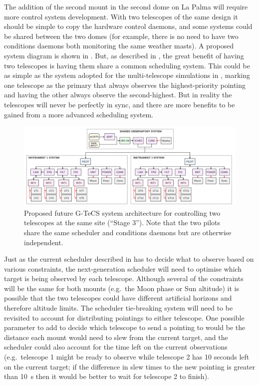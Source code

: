 \begin{colsection}
\begin{colsection}
The addition of the second mount in the second dome on La Palma will require more control system development. With two telescopes of the same design it should be simple to copy the hardware control daemons, and some systems could be shared between the two domes (for example, there is no need to have two conditions daemons both monitoring the same weather masts). A proposed system diagram is shown in . But, as described in , the great benefit of having two telescopes is having them share a common scheduling system. This could be as simple as the system adopted for the multi-telescope simulations in , marking one telescope as the primary that always observes the highest-priority pointing and having the other always observe the second-highest. But in reality the telescopes will never be perfectly in sync, and there are more benefits to be gained from a more advanced scheduling system.

\begin{figure}[t]
    \begin{center}
        \includegraphics[width=\linewidth]{images/flow2.pdf}
    \end{center}
    \caption[Future G-TeCS system architecture for two telescopes]{
        Proposed future G-TeCS system architecture for controlling two telescopes at the same site (``Stage 3''). Note that the two pilots share the same scheduler and conditions daemons but are otherwise independent.
    }\label{fig:flow2}
\end{figure}

Just as the current scheduler described in  has to decide what to observe based on various constraints, the next-generation scheduler will need to optimise which target is being observed by each telescope. Although several of the constraints will be the same for both mounts (e.g.\ the Moon phase or Sun altitude) it is possible that the two telescopes could have different artificial horizons and therefore altitude limits. The scheduler tie-breaking system will need to be revisited to account for distributing pointings to either telescope. One possible parameter to add to decide which telescope to send a pointing to would be the distance each mount would need to slew from the current target, and the scheduler could also account for the time left on the current observations (e.g.\ telescope 1 might be ready to observe while telescope 2 has 10 seconds left on the current target; if the difference in slew times to the new pointing is greater than \SI{10}{\second} then it would be better to wait for telescope 2 to finish).


\end{colsection}
\end{colsection}
